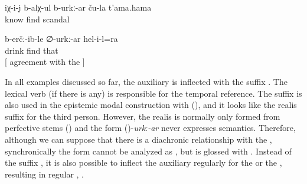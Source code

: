 \begin{exe}
	\ex	\label{ex:He probably knows their scandal@19}
	\gll	iχ-i-j	b-alχ-ul	b-urkː-ar	ču-la	t'ama.hama\\
			know	find		scandal\\
	\glt	{}

	\ex	\label{ex:He also drank probably agreement with ergative@18}
	\gll	b-erčː-ib-le	∅-urkː-ar	hel-i-l=ra\\
		drink	find		that\\
	\glt	{} [ agreement with the ]
\end{exe}

In all examples discussed so far, the auxiliary is inflected with the suffix  . The lexical verb (if there is any) is responsible for the temporal reference. The suffix  is also used in the epistemic modal construction with  (), and it looks like the realis  suffix for the third person. However, the realis  is normally only formed from perfective stems () and the form ()-\textit{urkː-ar} never expresses  semantics. Therefore, although we can suppose that there is a diachronic relationship with the , synchronically the form cannot be analyzed as , but is glossed with . Instead of the suffix , it is also possible to inflect the auxiliary regularly for the   or the , resulting in regular   , .\largerpage[-2]

